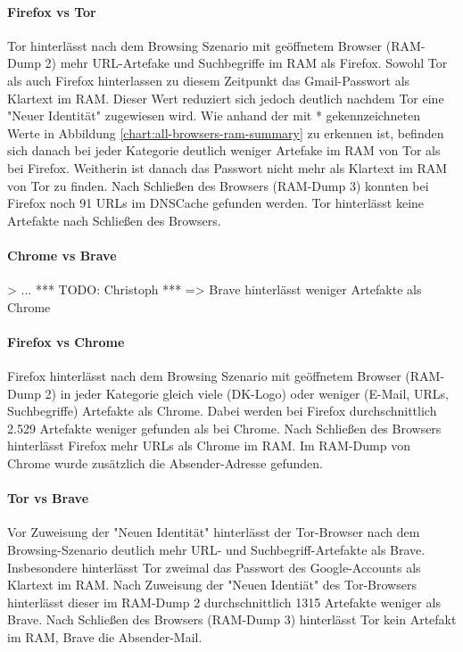 \paragraph*{Firefox vs Tor}
Tor hinterlässt nach dem Browsing Szenario mit geöffnetem Browser (RAM-Dump 2) mehr URL-Artefake und Suchbegriffe im RAM als Firefox. 
Sowohl Tor als auch Firefox hinterlassen zu diesem Zeitpunkt das Gmail-Passwort als Klartext im RAM.
Dieser Wert reduziert sich jedoch deutlich nachdem Tor eine "Neuer Identität" zugewiesen wird. 
Wie anhand der mit * gekennzeichneten Werte in Abbildung \ref{chart:all-browsers-ram-summary} zu erkennen ist, befinden sich danach bei jeder Kategorie deutlich weniger Artefake im RAM von Tor als bei Firefox. 
Weitherin ist danach das Passwort nicht mehr als Klartext im RAM von Tor zu finden.
Nach Schließen des Browsers (RAM-Dump 3) konnten bei Firefox noch 91 URLs im DNSCache gefunden werden. 
Tor hinterlässt keine Artefakte nach Schließen des Browsers.

\paragraph*{Chrome vs Brave}
> ... *** TODO: Christoph ***
=> Brave hinterlässt weniger Artefakte als Chrome

\paragraph*{Firefox vs Chrome}
Firefox hinterlässt nach dem Browsing Szenario mit geöffnetem Browser (RAM-Dump 2) in jeder Kategorie gleich viele (DK-Logo) oder weniger (E-Mail, URLs, Suchbegriffe) Artefakte als Chrome.
Dabei werden bei Firefox durchschnittlich 2.529 Artefakte weniger gefunden als bei Chrome.
Nach Schließen des Browsers hinterlässt Firefox mehr URLs als Chrome im RAM. Im RAM-Dump von Chrome wurde zusätzlich die Absender-Adresse gefunden.

\paragraph*{Tor vs Brave}
Vor Zuweisung der "Neuen Identität" hinterlässt der Tor-Browser nach dem Browsing-Szenario deutlich mehr URL- und Suchbegriff-Artefakte als Brave. Insbesondere hinterlässt Tor zweimal das Passwort des Google-Accounts als Klartext im RAM.
Nach Zuweisung der "Neuen Identiät" des Tor-Browsers hinterlässt dieser im RAM-Dump 2 durchschnittlich 1315 Artefakte weniger als Brave.
Nach Schließen des Browsers (RAM-Dump 3) hinterlässt Tor kein Artefakt im RAM, Brave die Absender-Mail. 

